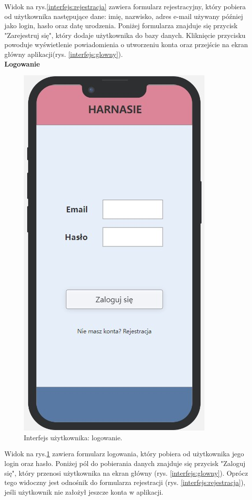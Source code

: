     Widok na rys.\ref{interfejs:rejestracja} zawiera formularz rejestracyjny, który pobiera od użytkownika następujące dane: imię, nazwisko, adres e-mail używany później jako login, hasło oraz datę urodzenia. Poniżej formularza znajduje się przycisk "Zarejestruj się", który dodaje użytkownika do bazy danych. Kliknięcie przycisku powoduje wyświetlenie powiadomienia o utworzeniu konta oraz przejście na ekran główny aplikacji(rys. \ref{interfejs:glowny}). \\
    \textbf{Logowanie} 
     \begin{figure}[H]
        \centering
        \includegraphics[scale=0.5]{img/interfejsy/if_loguj.jpg}
        \caption{Interfejs użytkownika: logowanie.}
        \label{interfejs:logowanie}
    \end{figure}
    Widok na rys.\ref{interfejs:logowanie} zawiera formularz logowania, który pobiera od użytkownika jego login oraz hasło. Poniżej pól do pobierania danych znajduje się przycisk "Zaloguj się", który przenosi użytkownika na ekran główny (rys. \ref{interfejs:glowny}). Oprócz tego widoczny jest odnośnik do formularza rejestracji (rys. \ref{interfejs:rejestracja}), jeśli użytkownik nie założył jeszcze konta w aplikacji. \\
